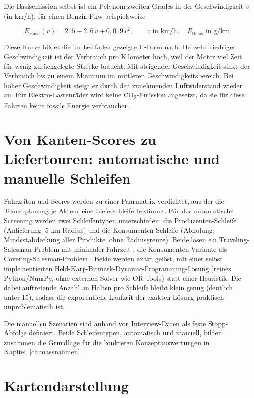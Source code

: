 \documentclass[a4paper,11pt,parskip=half,numbers=noenddot]{scrreprt}
\begin{document}
Die Basisemission selbst ist ein Polynom zweiten Grades in der Geschwindigkeit $v$ (in km/h), für einen Benzin-Pkw beispielsweise

\begin{equation}
E_{\text{Basis}}(v) = 215 - 2{,}6\,v + 0{,}019\,v^{2}, \qquad v \text{ in km/h}, \quad E_{\text{Basis}} \text{ in g/km}
\end{equation}

Diese Kurve bildet die im Leitfaden gezeigte U-Form nach: Bei sehr niedriger Geschwindigkeit ist der Verbrauch pro Kilometer hoch, weil der Motor viel Zeit für wenig zurückgelegte Strecke braucht. Mit steigender Geschwindigkeit sinkt der Verbrauch bis zu einem Minimum im mittleren Geschwindigkeitsbereich. Bei hoher Geschwindigkeit steigt er durch den zunehmenden Luftwiderstand wieder an. Für Elektro-Lastenräder wird keine CO\textsubscript{2}-Emission angesetzt, da sie für diese Fahrten keine fossile Energie verbrauchen.

\section{Von Kanten-Scores zu Liefertouren: automatische und manuelle Schleifen}

Fahrzeiten und Scores werden zu einer Paarmatrix verdichtet, aus der die Tourenplanung je Akteur eine Lieferschleife bestimmt. Für das automatische Screening werden zwei Schleifentypen unterschieden: die Produzenten-Schleife (Anlieferung, 5-km-Radius) und die Konsumenten-Schleife (Abholung, Mindestabdeckung aller Produkte, ohne Radiusgrenze). Beide lösen ein Traveling-Salesman-Problem mit minimaler Fahrzeit \parencite{Applegate2006}, die Konsumenten-Variante als Covering-Salesman-Problem \parencite{Current1989}. Beide werden exakt gelöst, mit einer selbst implementierten Held-Karp-Bitmask-Dynamic-Programming-Lösung (reines Python/NumPy, ohne externen Solver wie OR-Tools) statt einer Heuristik. Die dabei auftretende Anzahl an Halten pro Schleife bleibt klein genug (deutlich unter 15), sodass die exponentielle Laufzeit der exakten Lösung praktisch unproblematisch ist.

Die manuellen Szenarien sind anhand von Interview-Daten als feste Stopp-Abfolge definiert. Beide Schleifentypen, automatisch und manuell, bilden zusammen die Grundlage für die konkreten Konzeptauswertungen in Kapitel~\ref{ch:massnahmen}.

\section{Kartendarstellung}
\end{document}
